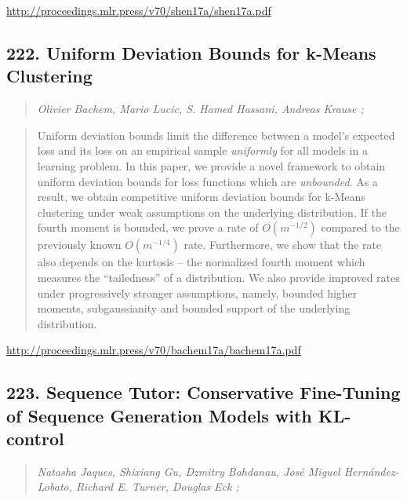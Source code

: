 \documentclass{article}
\begin{document}
\href{http://proceedings.mlr.press/v70/shen17a/shen17a.pdf}{http://proceedings.mlr.press/v70/shen17a/shen17a.pdf}

\subsection{222. Uniform Deviation Bounds for k-Means Clustering}

\begin{quote}
\footnotesize{\textit{Olivier Bachem, Mario Lucic, S. Hamed Hassani, Andreas Krause ;}}
\end{quote}

\begin{quote}
    Uniform deviation bounds limit the difference between a model’s expected loss and its loss on an empirical sample \textit{uniformly} for all models in a learning problem. In this paper, we provide a novel framework to obtain uniform deviation bounds for loss functions which are \textit{unbounded}. As a result, we obtain competitive uniform deviation bounds for k-Means clustering under weak assumptions on the underlying distribution. If the fourth moment is bounded, we prove a rate of $O(m^{-1/2})$ compared to the previously known $O(m^{-1/4})$ rate. Furthermore, we show that the rate also depends on the kurtosis – the normalized fourth moment which measures the “tailedness” of a distribution. We also provide improved rates under progressively stronger assumptions, namely, bounded higher moments, subgaussianity and bounded support of the underlying distribution.  \end{quote}

\href{http://proceedings.mlr.press/v70/bachem17a/bachem17a.pdf}{http://proceedings.mlr.press/v70/bachem17a/bachem17a.pdf}

\subsection{223. Sequence Tutor: Conservative Fine-Tuning of Sequence Generation Models with KL-control}

\begin{quote}
\footnotesize{\textit{Natasha Jaques, Shixiang Gu, Dzmitry Bahdanau, José Miguel Hernández-Lobato, Richard E. Turner, Douglas Eck ;}}
\end{quote}
\end{document}

